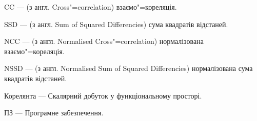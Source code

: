 \shortings{}
CC --- (з англ. Cross"=correlation) взаємо"=кореляція.

SSD --- (з англ. Sum of Squared Differencies) сума квадратів відстаней.

NCC --- (з англ. Normalised Cross"=correlation) нормалізована взаємо"=кореляція.

NSSD --- (з англ. Normalised Sum of Squared Differencies) нормалізована сума квадратів відстаней.

Корелянта --- Скалярний добуток у функціональному просторі.

ПЗ --- Програмне забезпечення.

